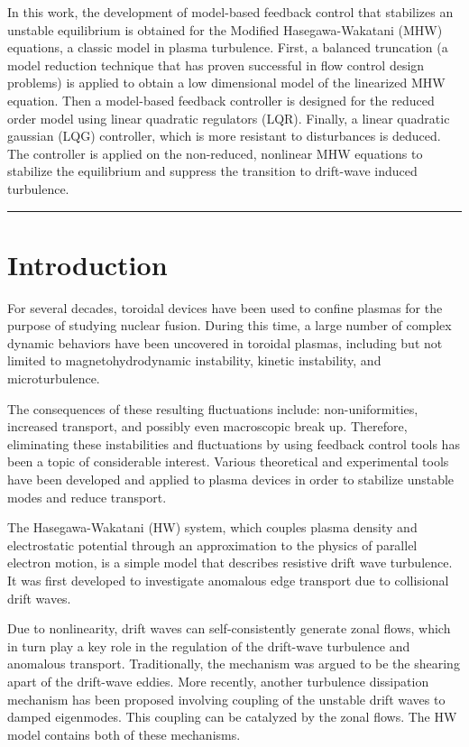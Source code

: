 \documentclass[12pt,lot, lof]{puthesis}
\begin{document}
\noindent
In this work, the development of model-based feedback control that stabilizes an unstable equilibrium is obtained for the Modified Hasegawa-Wakatani (MHW) equations, a classic model in plasma turbulence. First, a balanced truncation (a model reduction technique that has proven successful in flow control design problems) is applied to obtain a low dimensional model of the linearized MHW equation. Then a model-based feedback controller is designed for the reduced order model using linear quadratic regulators (LQR). Finally,  a linear quadratic gaussian (LQG) controller, which is more resistant to disturbances is deduced. The controller is applied on the non-reduced, nonlinear MHW equations to stabilize the equilibrium and suppress the transition to drift-wave induced turbulence. \\

\hrule

\section{Introduction}

For several decades, toroidal devices have been used to confine plasmas for the purpose of studying nuclear fusion. During this time, a large number of complex dynamic behaviors have been uncovered in toroidal plasmas, including but not limited to magnetohydrodynamic instability, kinetic instability, and microturbulence.

The consequences of these resulting fluctuations include: non-uniformities, increased transport, and possibly even macroscopic break up. Therefore, eliminating these instabilities and fluctuations by using feedback control tools \cite{Richards, Uckan, Kan, Crisanti, Luce, Figarella} has been a topic of considerable interest. Various theoretical and experimental tools have been developed and applied to plasma devices in order to stabilize unstable modes and reduce transport. \cite{Sen1, Chiu1, Sen2, Chiu2, Sen3, Sen4}

The Hasegawa-Wakatani \cite{Hasegawa1,Hasegawa2}  (HW) system, which couples plasma density and electrostatic potential through an approximation to the physics of parallel electron motion, is a simple model that describes resistive drift wave turbulence. It was first developed to investigate anomalous edge transport due to collisional drift waves. \cite{Horton}

Due to nonlinearity, drift waves can self-consistently generate zonal flows, which in turn play a key role in the regulation of the drift-wave turbulence and anomalous transport.  Traditionally, the mechanism was argued to be the shearing apart of the drift-wave eddies.  \cite{Wang, Itoh} 
More recently, another turbulence dissipation mechanism has been proposed involving coupling of the unstable drift waves to damped eigenmodes. \cite{Terry1}  This coupling can be catalyzed by the zonal flows.  \cite{Terry2} The HW model contains both of these mechanisms.
\end{document}

